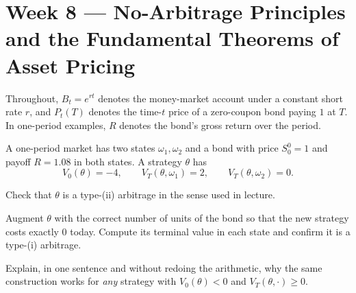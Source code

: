 \section{Week 8 --- No-Arbitrage Principles and the Fundamental Theorems of Asset Pricing}

Throughout, \(B_t=e^{rt}\) denotes the money-market account under a constant
short rate \(r\), and \(P_t(T)\) denotes the time-\(t\) price of a
zero-coupon bond paying \(1\) at \(T\). In one-period examples, \(R\) denotes
the bond's gross return over the period.

\ifIncludeCore

\setcounter{exercise}{0}
\begin{exercise}
A one-period market has two states \(\omega_1,\omega_2\) and a bond with
price \(S_0^0=1\) and payoff \(R=1.08\) in both states. A strategy
\(\theta\) has
\[
V_0(\theta)=-4,
\qquad
V_T(\theta,\omega_1)=2,
\qquad
V_T(\theta,\omega_2)=0.
\]
\begin{exparts}
  \item Check that \(\theta\) is a type-(ii) arbitrage in the sense used in
  lecture.
  \item Augment \(\theta\) with the correct number of units of the bond so
  that the new strategy costs exactly \(0\) today. Compute its terminal
  value in each state and confirm it is a type-(i) arbitrage.
  \item Explain, in one sentence and without redoing the arithmetic, why the
  same construction works for \emph{any} strategy with \(V_0(\theta)<0\) and
  \(V_T(\theta,\cdot)\geq0\).
\end{exparts}
\end{exercise}

